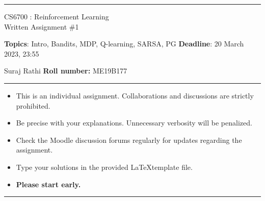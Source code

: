 \documentclass[addpoints,12pt,solution]{exam}
\begin{document}
    \hrule
    \vspace{1mm}
    \noindent
    \begin{center}
    {\Large CS6700 : Reinforcement Learning}
        \\
        {\large Written Assignment \#1}
    \end{center}
    \vspace{1mm}
    \noindent
    {\textbf{Topics}: Intro, Bandits, MDP, Q-learning, SARSA, PG \hfill \textbf{Deadline}: 20 March 2023, 23:55}


     Suraj Rathi  \hfill {\bf Roll number: } ME19B177
    \vspace{2mm}
    \hrule

    {\small

        \begin{itemize}
            \itemsep0mm
            \item This is an individual assignment. Collaborations and discussions are strictly
            prohibited.
            \item Be precise with your explanations. Unnecessary verbosity will be penalized.
            \item Check the Moodle discussion forums regularly for updates regarding the assignment.
            \item Type your solutions in the provided \LaTeX template file.
            \item \textbf{Please start early.}
        \end{itemize}
    }

    \hrule

    \vspace{3mm}


\end{document}

